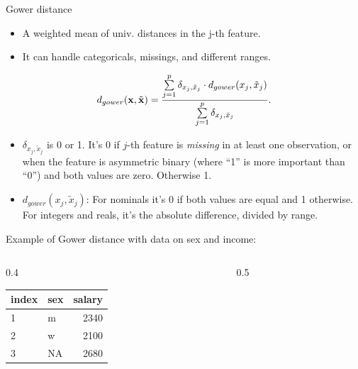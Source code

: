 \documentclass[11pt,compress,t,notes=noshow, xcolor=table]{beamer}
\begin{document}
\begin{vbframe}{Gower distance}
\begin{itemize}
    \item A weighted mean of univ. distances in the j-th feature.
    \item It can handle categoricals, missings, and different ranges.
\end{itemize}


$$d_{gower}(\mathbf{x}, \tilde{\mathbf{x}}) = \frac{\sum\limits_{j=1}^p \delta_{x_j,\tilde{x}_j} \cdot d_{gower}(x_j,\tilde{x}_j)}{
\sum\limits_{j=1}^p \delta_{x_j,\tilde{x}_j}}.
$$

\begin{itemize}

  \item \(\delta_{x_j,\tilde{x}_j}\) is 0 or 1.
  It's 0 if $j$-th feature is \emph{missing} in at least one observation,
  or when the feature is asymmetric binary (where \enquote{1} is more
  important than \enquote{0}) and both values are zero. Otherwise 1.
  \item \(d_{gower}(x_j,\tilde{x}_j)\):
  For nominals it's 0 if both values are equal and 1 otherwise.
  For integers and reals, it's the absolute difference, divided by range.

\end{itemize}

\framebreak

Example of Gower distance with data on sex and income:

\begin{columns}[T]
  \begin{column}{0.4\textwidth}
\begin{knitrout}\scriptsize
{}\color{fgcolor}\begin{table}[H]
\centering\begingroup\fontsize{10}{12}\selectfont

\begin{tabular}{>{\leavevmode\color{black}}l|>{\leavevmode\color{black}}l|>{\leavevmode\color{black}}r}
\hline
index & sex & salary\\
\hline
1 & m & 2340\\
\hline
2 & w & 2100\\
\hline
3 & NA & 2680\\
\hline
\end{tabular}
\endgroup{}
\end{table}


\end{knitrout}
  \end{column}
  \begin{column}{0.5\textwidth}
    \vspace{0.6cm}
  \end{column}
\end{columns}


\end{vbframe}
\end{document}
